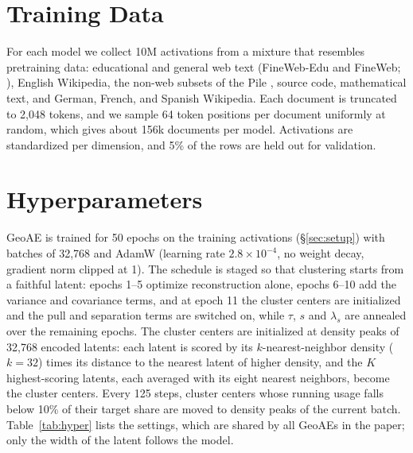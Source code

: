 \documentclass[11pt]{article}
\begin{document}
\appendix

\section{Training Data}
\label{app:data}

For each model we collect 10M activations from a mixture that resembles pretraining data: educational and general web text (FineWeb-Edu and FineWeb; \citealp{penedo2024fineweb}), English Wikipedia, the non-web subsets of the Pile \citep{gao2020pile}, source code, mathematical text, and German, French, and Spanish Wikipedia.
Each document is truncated to 2{,}048 tokens, and we sample 64 token positions per document uniformly at random, which gives about 156k documents per model.
Activations are standardized per dimension, and 5\% of the rows are held out for validation.

\section{Hyperparameters}
\label{app:hyper}

GeoAE is trained for 50 epochs on the training activations (\S\ref{sec:setup}) with batches of 32{,}768 and AdamW \citep{loshchilov2019adamw} (learning rate $2.8 \times 10^{-4}$, no weight decay, gradient norm clipped at 1).
The schedule is staged so that clustering starts from a faithful latent: epochs 1--5 optimize reconstruction alone, epochs 6--10 add the variance and covariance terms, and at epoch 11 the cluster centers are initialized and the pull and separation terms are switched on, while $\tau$, $s$ and $\lambda_s$ are annealed over the remaining epochs.
The cluster centers are initialized at density peaks \citep{rodriguez2014peaks} of 32{,}768 encoded latents: each latent is scored by its $k$-nearest-neighbor density ($k = 32$) times its distance to the nearest latent of higher density, and the $K$ highest-scoring latents, each averaged with its eight nearest neighbors, become the cluster centers.
Every 125 steps, cluster centers whose running usage falls below 10\% of their target share are moved to density peaks of the current batch.
Table~\ref{tab:hyper} lists the settings, which are shared by all GeoAEs in the paper; only the width of the latent follows the model.
\end{document}
